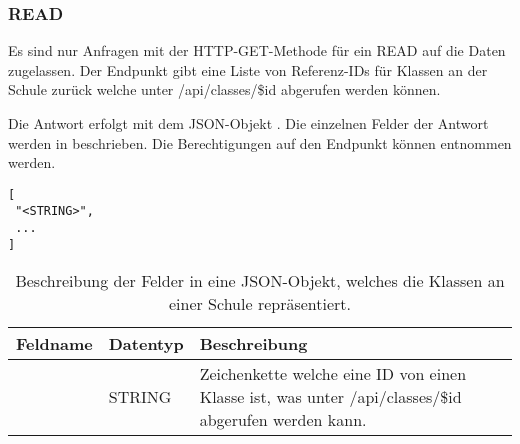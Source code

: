 \subsubsection{READ}
\label{sec:rest:api:schools:classes:read}
Es sind nur Anfragen mit der HTTP-GET-Methode für ein READ auf die Daten zugelassen.
Der Endpunkt gibt eine Liste von Referenz-IDs für Klassen an der Schule zurück welche unter /api/classes/\$id abgerufen werden können.

Die Antwort erfolgt mit dem JSON-Objekt . 
Die einzelnen Felder der Antwort werden in  beschrieben.
Die Berechtigungen auf den Endpunkt können  entnommen werden.


\begin{lstlisting}[caption={JSON-Antwort für einen GET-Aufruf der Route /api/schools/\$id/classes},label={lst:code:rest:api:schools:classes:read:ret},frame=tlrb]
[
 "<STRING>",
 ...
]
\end{lstlisting}
\begin{longtable}{|p{}|p{}|p{}|}
		\caption{Beschreibung der Felder in eine JSON-Objekt, welches die Klassen an einer Schule repräsentiert.}
\endfoot
		\caption{Beschreibung der Felder in eine JSON-Objekt, welches die Klassen an einer Schule repräsentiert.}
		\label{tab:rest:api:schools:classes:read:ret:json}
\endlastfoot 
\hline
			\textbf{Feldname} & \textbf{Datentyp} & \textbf{Beschreibung} \\ \hline
\endhead
 & STRING & Zeichenkette welche eine ID von einen Klasse ist, was unter /api/classes/\$id abgerufen werden kann. \\ \hline
\end{longtable}